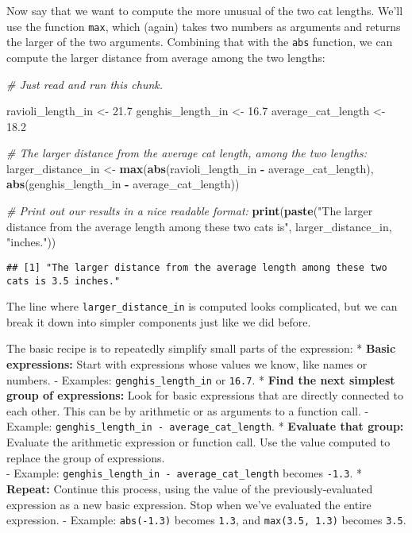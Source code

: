 \documentclass[
]{article}
\newenvironment{Shaded}{\begin{snugshade}}{\end{snugshade}}
\newcommand{\CommentTok}[1]{\textcolor[rgb]{0.56,0.35,0.01}{\textit{#1}}}
\newcommand{\FloatTok}[1]{\textcolor[rgb]{0.00,0.00,0.81}{#1}}
\newcommand{\FunctionTok}[1]{\textcolor[rgb]{0.13,0.29,0.53}{\textbf{#1}}}
\newcommand{\NormalTok}[1]{#1}
\newcommand{\OtherTok}[1]{\textcolor[rgb]{0.56,0.35,0.01}{#1}}
\newcommand{\SpecialCharTok}[1]{\textcolor[rgb]{0.81,0.36,0.00}{\textbf{#1}}}
\newcommand{\StringTok}[1]{\textcolor[rgb]{0.31,0.60,0.02}{#1}}
\begin{document}
Now say that we want to compute the more unusual of the two cat lengths.
We'll use the function \texttt{max}, which (again) takes two numbers as
arguments and returns the larger of the two arguments. Combining that
with the \texttt{abs} function, we can compute the larger distance from
average among the two lengths:

\begin{Shaded}
\begin{Highlighting}[]
\CommentTok{\# Just read and run this chunk.}

\NormalTok{ravioli\_length\_in }\OtherTok{\textless{}{-}} \FloatTok{21.7}
\NormalTok{genghis\_length\_in }\OtherTok{\textless{}{-}} \FloatTok{16.7}
\NormalTok{average\_cat\_length }\OtherTok{\textless{}{-}} \FloatTok{18.2}

\CommentTok{\# The larger distance from the average cat length, among the two lengths:}
\NormalTok{larger\_distance\_in }\OtherTok{\textless{}{-}} \FunctionTok{max}\NormalTok{(}\FunctionTok{abs}\NormalTok{(ravioli\_length\_in }\SpecialCharTok{{-}}\NormalTok{ average\_cat\_length), }\FunctionTok{abs}\NormalTok{(genghis\_length\_in }\SpecialCharTok{{-}}\NormalTok{ average\_cat\_length))}

\CommentTok{\# Print out our results in a nice readable format:}
\FunctionTok{print}\NormalTok{(}\FunctionTok{paste}\NormalTok{(}\StringTok{"The larger distance from the average length among these two cats is"}\NormalTok{, larger\_distance\_in, }\StringTok{"inches."}\NormalTok{))}
\end{Highlighting}
\end{Shaded}

\begin{verbatim}
## [1] "The larger distance from the average length among these two cats is 3.5 inches."
\end{verbatim}

The line where \texttt{larger\_distance\_in} is computed looks
complicated, but we can break it down into simpler components just like
we did before.

The basic recipe is to repeatedly simplify small parts of the
expression: * \textbf{Basic expressions:} Start with expressions whose
values we know, like names or numbers. - Examples:
\texttt{genghis\_length\_in} or \texttt{16.7}. * \textbf{Find the next
simplest group of expressions:} Look for basic expressions that are
directly connected to each other. This can be by arithmetic or as
arguments to a function call. - Example:
\texttt{genghis\_length\_in\ -\ average\_cat\_length}. *
\textbf{Evaluate that group:} Evaluate the arithmetic expression or
function call. Use the value computed to replace the group of
expressions.\\
- Example: \texttt{genghis\_length\_in\ -\ average\_cat\_length} becomes
\texttt{-1.3}. * \textbf{Repeat:} Continue this process, using the value
of the previously-evaluated expression as a new basic expression. Stop
when we've evaluated the entire expression. - Example:
\texttt{abs(-1.3)} becomes \texttt{1.3}, and \texttt{max(3.5,\ 1.3)}
becomes \texttt{3.5}.
\end{document}
